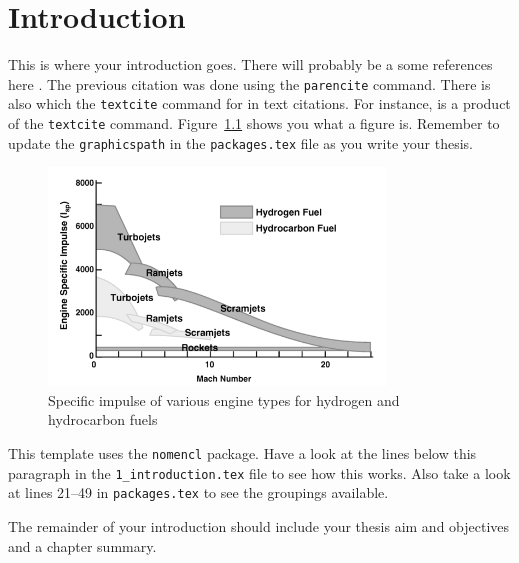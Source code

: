 
\cleardoublepage
\chapter{Introduction}

  This is where your introduction goes. There will probably be a some references here \parencite{Denman2016a}. The previous citation was done using the \texttt{parencite} command. There is also which the \texttt{textcite} command for in text citations. For instance, \textcite{Colket2001} is a product of the \texttt{textcite} command. Figure~\ref{introduction:specific-impulse} shows you what a figure is. Remember to update the \texttt{graphicspath} in the \texttt{packages.tex} file as you write your thesis.

  \begin{figure}
    \centering
    \includegraphics[width=0.8\textwidth]{./figures/1_introduction/specific-impulse}
    \caption{Specific impulse of various engine types for hydrogen and hydrocarbon fuels \parencite{Fry2004}}\label{introduction:specific-impulse}
  \end{figure}

  This template uses the \texttt{nomencl} package. Have a look at the lines below this paragraph in the \texttt{1\_introduction.tex} file to see how this works. Also take a look at lines 21--49 in \texttt{packages.tex} to see the groupings available.

  The remainder of your introduction should include your thesis aim and objectives and a chapter summary.
  
